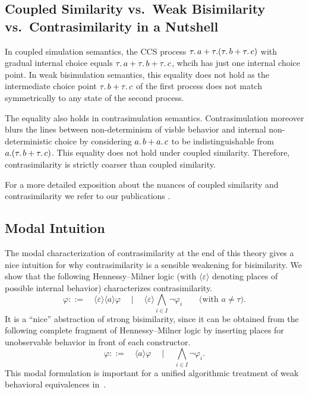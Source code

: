 \documentclass[10pt,a4paper]{article}
\begin{document}
\subsection{Coupled Similarity vs.\ Weak Bisimilarity vs.\ Contrasimilarity in a Nutshell}

In coupled simulation semantics, the CCS process $\tau \ldotp a + \tau \ldotp\!(\tau \ldotp b + \tau \ldotp c)$
with gradual internal choice equals $\tau \ldotp a + \tau \ldotp b + \tau \ldotp c$, whcih has just
one internal choice point.
In weak bisimulation semantics, this equality does not hold as the intermediate choice point
$\tau \ldotp b + \tau \ldotp c$ of the first process does not match symmetrically to any state of
the second process.

The equality also holds in contrasimulation semantics. Contrasimulation moreover blurs the lines
between non-determinism of visble behavior and internal non-deterministic choice by considering
$a \ldotp b + a \ldotp c$ to be indistinguishable from $a \ldotp\!(\tau \ldotp b + \tau \ldotp c)$.
This equality does not hold under coupled similarity. Therefore, contrasimilarity is strictly coarser
than coupled similarity.

For a more detailed exposition about the nuances of coupled similarity and contrasimilarity we refer
to our publications \cite{bn2019coupledsimTacas,bnp2020coupledsim32,bm2021contrasimilarity}.

\subsection{Modal Intuition}

The modal characterization of contrasimilarity at the end of this theory gives a nice intuition
for why contrasimilarity is a sensible weakening for bisimilarity. We show that the following
Hennessy--Milner logic (with $\langle \varepsilon \rangle$ denoting places of possible internal
behavior) characterizes contrasimilarity.
\[
  \varphi  ::= \quad \langle \varepsilon \rangle \langle a\rangle \varphi
    \quad \mid \quad \langle \varepsilon \rangle \bigwedge_{i \in I} \neg \varphi_i
       \qquad \text{(with $a \neq \tau$).}
\]
It is a ``nice'' abstraction of strong bisimilarity, since it can be obtained from the following
complete fragment of Hennessy--Milner logic by inserting places for unobservable behavior in front of
each constructor.
\[
    \varphi  ::= \quad \langle a \rangle \varphi
      \quad \mid \quad \bigwedge_{i \in I} \neg \varphi_i .
\]
This modal formulation is important for a unified algorithmic treatment of weak behavioral equivalences
in~\cite{bj2023ltbtsSilentSteps}.



{}


\end{document}
